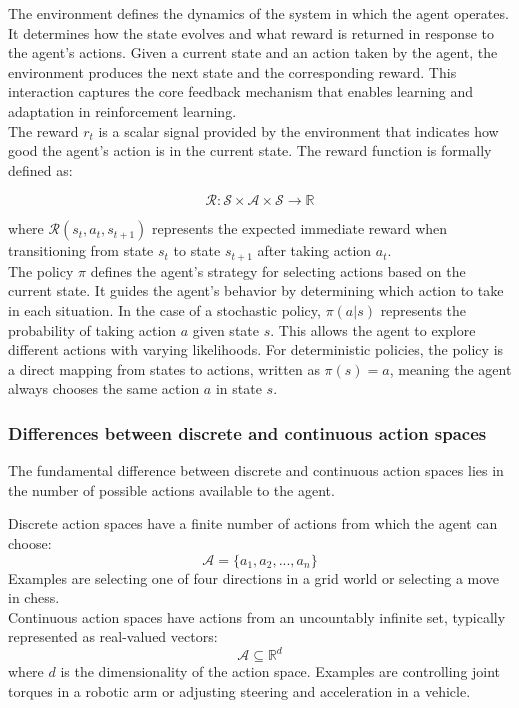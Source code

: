 \noindent The environment defines the dynamics of the system in which the agent operates. It determines how the state evolves and what reward is returned in response to the agent’s actions. Given a current state and an action taken by the agent, the environment produces the next state and the corresponding reward. This interaction captures the core feedback mechanism that enables learning and adaptation in reinforcement learning.\\

\noindent The reward \( r_t \) is a scalar signal provided by the environment that indicates how good the agent’s action is in the current state. The reward function is formally defined as:

\begin{equation}
\mathcal{R}: \mathcal{S} \times \mathcal{A} \times \mathcal{S} \rightarrow \mathbb{R}
\end{equation}

\noindent where \( \mathcal{R}(s_t, a_t, s_{t+1}) \) represents the expected immediate reward when transitioning from state \( s_t \) to state \( s_{t+1} \) after taking action \( a_t \).\\

\noindent The policy \( \pi \) defines the agent’s strategy for selecting actions based on the current state. It guides the agent’s behavior by determining which action to take in each situation. In the case of a stochastic policy, \( \pi(a|s) \) represents the probability of taking action \( a \) given state \( s \). This allows the agent to explore different actions with varying likelihoods. For deterministic policies, the policy is a direct mapping from states to actions, written as \( \pi(s) = a \), meaning the agent always chooses the same action \( a \) in state \( s \).

\subsubsection{Differences between discrete and continuous action spaces}

The fundamental difference between discrete and continuous action spaces lies in the number of possible actions available to the agent.

\noindent Discrete action spaces have a finite number of actions from which the agent can choose:
\begin{equation}
    \mathcal{A} = \{a_1, a_2, ..., a_n\}
\end{equation}
Examples are selecting one of four directions in a grid world or selecting a move in chess.\\
\noindent Continuous action spaces have actions from an uncountably infinite set, typically represented as real-valued vectors:
\begin{equation}
\mathcal{A} \subseteq \mathbb{R}^d
\end{equation}
where $d$ is the dimensionality of the action space. Examples are controlling joint torques in a robotic arm or adjusting steering and acceleration in a vehicle.\\


